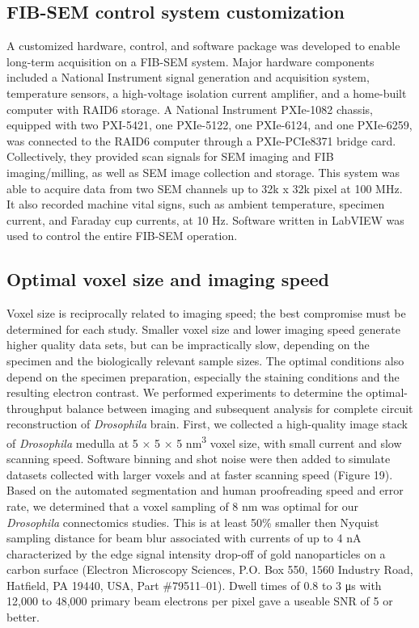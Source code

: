 \documentclass{article}
\begin{document}
\subsection*{FIB-SEM control system customization}

A customized hardware, control, and software package was developed to enable long-term acquisition on a FIB-SEM system. Major hardware components included a National Instrument signal generation and acquisition system, temperature sensors, a high-voltage isolation current amplifier, and a home-built computer with RAID6 storage. A National Instrument PXIe-1082 chassis, equipped with two PXI-5421, one PXIe-5122, one PXIe-6124, and one PXIe-6259, was connected to the RAID6 computer through a PXIe-PCIe8371 bridge card. Collectively, they provided scan signals for SEM imaging and FIB imaging/milling, as well as SEM image collection and storage. This system was able to acquire data from two SEM channels up to 32k x 32k pixel at 100 MHz. It also recorded machine vital signs, such as ambient temperature, specimen current, and Faraday cup currents, at 10 Hz. Software written in LabVIEW was used to control the entire FIB-SEM operation.

\subsection*{Optimal voxel size and imaging speed}

Voxel size is reciprocally related to imaging speed; the best compromise must be determined for each study. Smaller voxel size and lower imaging speed generate higher quality data sets, but can be impractically slow, depending on the specimen and the biologically relevant sample sizes. The optimal conditions also depend on the specimen preparation, especially the staining conditions and the resulting electron contrast. We performed experiments to determine the optimal-throughput balance between imaging and subsequent analysis for complete circuit reconstruction of \emph{Drosophila} brain. First, we collected a high-quality image stack of \emph{Drosophila} medulla at 5 × 5 × 5 nm\textsuperscript{3} voxel size, with small current and slow scanning speed. Software binning and shot noise were then added to simulate datasets collected with larger voxels and at faster scanning speed (Figure 19). Based on the automated segmentation and human proofreading speed and error rate, we determined that a voxel sampling of 8 nm was optimal for our \emph{Drosophila} connectomics studies. This is at least 50\% smaller then Nyquist sampling distance for beam blur associated with currents of up to 4 nA characterized by the edge signal intensity drop-off of gold nanoparticles on a carbon surface (Electron Microscopy Sciences, P.O. Box 550, 1560 Industry Road, Hatfield, PA 19440, USA, Part \#79511–01). Dwell times of 0.8 to 3 μs with 12,000 to 48,000 primary beam electrons per pixel gave a useable SNR of 5 or better.
\end{document}
